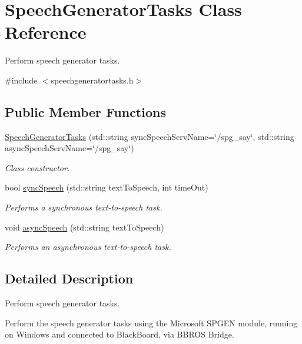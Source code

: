 \hypertarget{class_speech_generator_tasks}{}\section{Speech\+Generator\+Tasks Class Reference}
\label{class_speech_generator_tasks}


Perform speech generator tasks.  




{\ttfamily \#include $<$speechgeneratortasks.\+h$>$}

\subsection*{Public Member Functions}
\begin{DoxyCompactItemize}
\item 
\hyperlink{class_speech_generator_tasks_ac9db87c14680846c13176e95be96ad12}{Speech\+Generator\+Tasks} (std\+::string sync\+Speech\+Serv\+Name=\char`\"{}/spg\+\_\+say\char`\"{}, std\+::string async\+Speech\+Serv\+Name=\char`\"{}/spg\+\_\+say\char`\"{})
\begin{DoxyCompactList}\small\item\em Class constructor. \end{DoxyCompactList}\item 
bool \hyperlink{class_speech_generator_tasks_a041289135bb48e18a2e6de6ea2aa4add}{sync\+Speech} (std\+::string text\+To\+Speech, int time\+Out)
\begin{DoxyCompactList}\small\item\em Performs a synchronous text-\/to-\/speech task. \end{DoxyCompactList}\item 
void \hyperlink{class_speech_generator_tasks_a8de0e4b4e53876bf5d1c0f7576d981fc}{async\+Speech} (std\+::string text\+To\+Speech)
\begin{DoxyCompactList}\small\item\em Performs an asynchronous text-\/to-\/speech task. \end{DoxyCompactList}\end{DoxyCompactItemize}


\subsection{Detailed Description}
Perform speech generator tasks. 

Perform the speech generator tasks using the Microsoft S\+P\+G\+EN module, running on Windows and connected to Black\+Board, via B\+B\+R\+OS Bridge.

